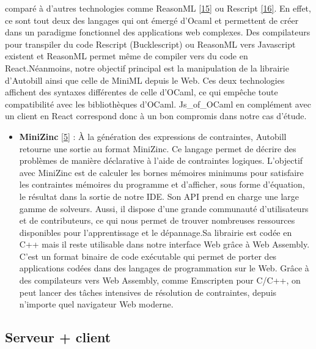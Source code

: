 \documentclass[12pt]{article}
\begin{document}
\begin{itemize}
        comparé à d'autres technologies comme ReasonML
        \protect\hyperlink{ref-reasonml}{{[}15{]}} ou Rescript
        \protect\hyperlink{ref-rescript}{{[}16{]}}. En effet, ce sont tout
        deux des langages qui ont émergé d'Ocaml et permettent de créer dans
        un paradigme fonctionnel des applications web complexes. Des
        compilateurs pour transpiler du code Rescript (Bucklescript) ou
        ReasonML vers Javascript existent et ReasonML permet même de compiler
        vers du code en React.\newline  Néanmoins, notre objectif principal
        est la manipulation de la librairie d'Autobill ainsi que celle de
        MiniML depuis le Web. Ces deux technologies affichent des syntaxes
        différentes de celle d'OCaml, ce qui empêche toute compatibilité avec
        les bibliothèques d'OCaml. Js\_of\_OCaml en complément avec un client
        en React correspond donc à un bon compromis dans notre cas d'étude.
\end{itemize}
\begin{itemize}
  \item
        \textbf{MiniZinc} \protect\hyperlink{ref-minizinc}{{[}5{]}} : À la
        génération des expressions de contraintes, Autobill retourne une
        sortie au format MiniZinc. Ce langage permet de décrire des problèmes
        de manière déclarative à l'aide de contraintes logiques. L'objectif
        avec MiniZinc est de calculer les bornes mémoires minimums pour
        satisfaire les contraintes mémoires du programme et d'afficher, sous
        forme d'équation, le résultat dans la sortie de notre IDE. Son API
        prend en charge une large gamme de solveurs. Aussi, il dispose d'une
        grande communauté d'utilisateurs et de contributeurs, ce qui nous
        permet de trouver nombreuses ressources disponibles pour
        l'apprentissage et le dépannage.\newline  Sa librairie est codée en
        C++ mais il reste utilisable dans notre interface Web grâce à Web
        Assembly. C'est un format binaire de code exécutable qui permet de
        porter des applications codées dans des langages de programmation sur
        le Web. Grâce à des compilateurs vers Web Assembly, comme Emscripten
        pour C/C++, on peut lancer des tâches intensives de résolution de
        contraintes, depuis n'importe quel navigateur Web moderne.
\end{itemize}
\fi 

\hypertarget{serveur-client}{%
  \subsection{Serveur + client}\label{serveur-client}}
\end{document}
